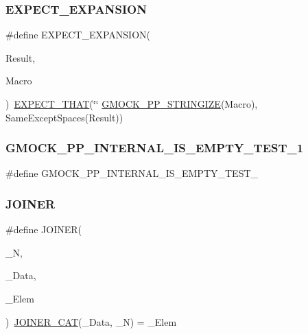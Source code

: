 \subsubsection{\texorpdfstring{EXPECT\_EXPANSION}{EXPECT\_EXPANSION}}
{\footnotesize\ttfamily \#define E\+X\+P\+E\+C\+T\+\_\+\+E\+X\+P\+A\+N\+S\+I\+ON(\begin{DoxyParamCaption}\item[{}]{Result,  }\item[{}]{Macro }\end{DoxyParamCaption})~\mbox{\hyperlink{_obj__test_2lib_2googletest-release-1_88_81_2googlemock_2include_2gmock_2gmock-matchers_8h_ac31e206123aa702e1152bb2735b31409}{E\+X\+P\+E\+C\+T\+\_\+\+T\+H\+AT}}(\char`\"{}\char`\"{} \mbox{\hyperlink{_obj__test_2lib_2googletest-master_2googlemock_2include_2gmock_2internal_2gmock-pp_8h_a5e7b60e34a7bb66bac56c440f6aa52cb}{G\+M\+O\+C\+K\+\_\+\+P\+P\+\_\+\+S\+T\+R\+I\+N\+G\+I\+ZE}}(Macro), Same\+Except\+Spaces(Result))}

\mbox{\label{googletest-master_2googlemock_2test_2gmock-pp-string__test_8cc_ab8635d85cb91992914a106bb5c229829}} 
\subsubsection{\texorpdfstring{GMOCK\_PP\_INTERNAL\_IS\_EMPTY\_TEST\_1}{GMOCK\_PP\_INTERNAL\_IS\_EMPTY\_TEST\_1}}
{\footnotesize\ttfamily \#define G\+M\+O\+C\+K\+\_\+\+P\+P\+\_\+\+I\+N\+T\+E\+R\+N\+A\+L\+\_\+\+I\+S\+\_\+\+E\+M\+P\+T\+Y\+\_\+\+T\+E\+S\+T\+\_}

\mbox{\label{googletest-master_2googlemock_2test_2gmock-pp-string__test_8cc_a417889002d582097e444f103350c05cb}} 
\subsubsection{\texorpdfstring{JOINER}{JOINER}}
{\footnotesize\ttfamily \#define J\+O\+I\+N\+ER(\begin{DoxyParamCaption}\item[{}]{\+\_\+N,  }\item[{}]{\+\_\+\+Data,  }\item[{}]{\+\_\+\+Elem }\end{DoxyParamCaption})~\mbox{\hyperlink{_obj__test_2lib_2googletest-master_2googlemock_2test_2gmock-pp-string__test_8cc_a061e03ac22467881369813e8d73ddf61}{J\+O\+I\+N\+E\+R\+\_\+\+C\+AT}}(\+\_\+\+Data, \+\_\+N) = \+\_\+\+Elem}

